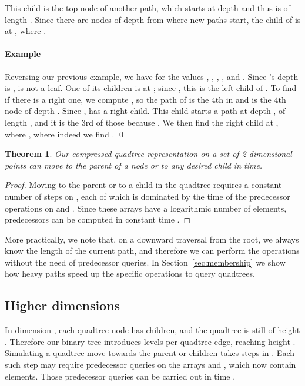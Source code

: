 \documentclass{elsarticle}
\newtheorem{theorem}{Theorem}
\newenvironment{example}{\paragraph{Example}}{\qed \medskip }
\begin{document}
This child is the top node of another path, which starts at depth  and thus is of length . Since there are  nodes of depth  from where new paths start, the child of  is at , where
.



\begin{example}
Reversing our previous example, we have for  the values , , , , and .  Since 's depth is ,  is not a leaf. One of its children is at ; since , this is the left child of . To find if there is a right one, we compute , so the path of  is the 4th in  and  is the 4th node of depth . Since ,  has a right child. This child starts a path at depth , of length , and it is the 3rd of those because . We then find the right child at , where , where indeed we find .
\end{example}



\begin{theorem}
Our compressed quadtree representation on a set of 2-dimensional points can move to the parent of a node or to any desired child in  time.
\end{theorem}
\begin{proof}
Moving to the parent or to a child in the quadtree requires a constant number of steps on , each of which is dominated by the time of the predecessor operations on  and . Since these arrays have a logarithmic number of elements, predecessors can be computed in constant time \cite{FW94}. 
\end{proof}

More practically, we note that, on a downward traversal from the root, we always know the length  of the current path, and therefore we can perform the operations without the need of predecessor queries. In Section~\ref{sec:membership} we show how heavy paths speed up the specific operations to query quadtrees.

\subsection{Higher dimensions}

In dimension , each quadtree node has  children, and the quadtree is still of height . Therefore our binary tree  introduces  levels per quadtree edge, reaching height . Simulating a quadtree move towards the parent or children takes  steps in . Each such step may require predecessor queries on the arrays  and , which now contain  elements. Those predecessor queries can be carried out in time  \cite{PT06}.
\end{document}
